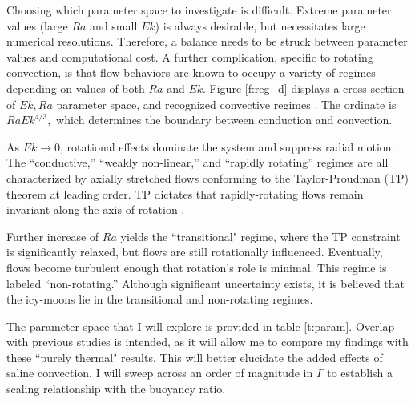 \documentclass[12pt]{article}
\begin{document}
Choosing which parameter space to investigate is difficult. 
Extreme parameter values (large $Ra$ and small $Ek$) is always desirable, but necessitates large numerical resolutions.  Therefore, a balance needs to be struck between parameter values and computational cost. 
A further complication, specific to rotating convection, is that flow behaviors are known to occupy a variety of regimes depending on values of both $Ra$ and $Ek$\citep{tG16}.
Figure \ref{f:reg_d} displays a cross-section of $Ek,Ra$ parameter space, and recognized convective regimes \citep{tG16}. The ordinate is $RaEk^{4/3},$ which determines the boundary between conduction and convection\citep{sC61}.

As $Ek\rightarrow 0$, rotational effects dominate the system and suppress radial motion. The ``conductive,'' ``weakly non-linear,'' and ``rapidly rotating'' regimes\citep{tG16,kJ12} are all characterized by axially stretched flows conforming to the Taylor-Proudman (TP) theorem at leading order. TP dictates that rapidly-rotating flows remain invariant along the axis of rotation \citep{gB53}.

Further increase of $Ra$ yields the ``transitional" regime, where the TP constraint is significantly relaxed, but flows are still rotationally influenced.
Eventually, flows become turbulent enough that rotation's role is minimal. This regime is labeled ``non-rotating.''
Although significant uncertainty exists, it is believed that the icy-moons lie in the transitional and non-rotating regimes\citep{dL23,tG16}.

The parameter space that I will explore is provided in table \ref{t:param}. Overlap with previous studies \citep{dL23,kS19} is intended, as it will allow me to compare my findings with these ``purely thermal" results. This will better elucidate the added effects of saline convection.
I will sweep across an order of magnitude in $\Gamma$ to establish a scaling relationship with the buoyancy ratio. 
\end{document}
